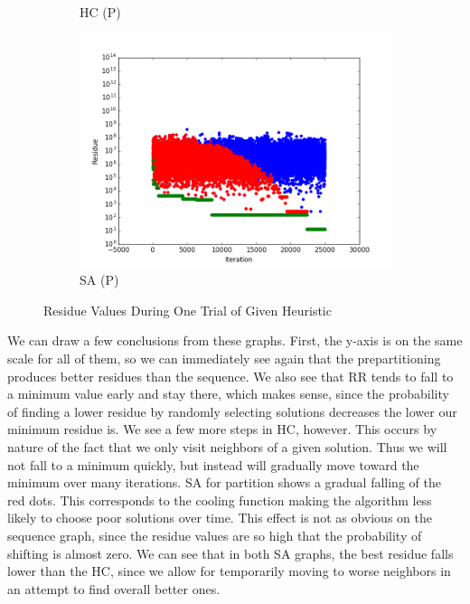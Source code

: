 \documentclass[12pt]{article}
\begin{document}
\begin{figure}[h]
\begin{center}
\begin{subfigure}[t]{0.3\textwidth}
\caption{HC (P)}
\end{subfigure}
\begin{subfigure}[t]{0.3\textwidth}
\includegraphics[width=\textwidth]{img/sap.png}
\caption{SA (P)}
\end{subfigure}
\caption{Residue Values During One Trial of Given Heuristic}
\end{center}
\end{figure}

We can draw a few conclusions from these graphs. First, the y-axis is on the same scale for all of them, so we can immediately see again that the prepartitioning produces better residues than the sequence. We also see that RR tends to fall to a minimum value early and stay there, which makes sense, since the probability of finding a lower residue by randomly selecting solutions decreases the lower our minimum residue is. We see a few more steps in HC, however. This occurs by nature of the fact that we only visit neighbors of a given solution. Thus we will not fall to a minimum quickly, but instead will gradually move toward the minimum over many iterations. SA for partition shows a gradual falling of the red dots. This corresponds to the cooling function making the algorithm less likely to choose poor solutions over time. This effect is not as obvious on the sequence graph, since the residue values are so high that the probability of shifting is almost zero. We can see that in both SA graphs, the best residue falls lower than the HC, since we allow for temporarily moving to worse neighbors in an attempt to find overall better ones. 
\end{document}
